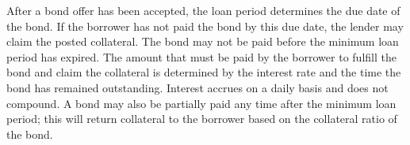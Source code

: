 After a bond offer has been accepted, the loan period determines the due date
of the bond. If the borrower has not paid the bond by this due date, the
lender may claim the posted collateral. The bond may not be paid before the
minimum loan period has expired. The amount that must be paid by the borrower
to fulfill the bond and claim the collateral is determined by the interest rate
and the time the bond has remained outstanding. Interest accrues on a daily
basis and does not compound. A bond may also be partially paid any time after
the minimum loan period; this will return collateral to the borrower based on
the collateral ratio of the bond.

